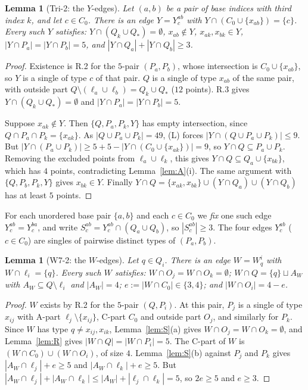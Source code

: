 \documentclass[11pt]{amsart}
\newtheorem{lemma}[theorem]{Lemma}
\theoremstyle{definition}
\begin{document}
\begin{lemma}[Tri-2: the $Y$-edges]\label{lem:tri2}
Let $(a,b)$ be a pair of base indices with third index $k$, and let $c\in C_0$. There is an edge $Y=Y^{ab}_c$ with $Y\cap(C_0\cup\{x_{ab}\})=\{c\}$. Every such $Y$ satisfies: $Y\cap(Q_k\cup Q_*)=\emptyset$, $x_{ab}\notin Y$, $x_{ak},x_{bk}\in Y$, $|Y\cap P_a|=|Y\cap P_b|=5$, and $|Y\cap Q_a|+|Y\cap Q_b|\ge 3$.
\end{lemma}
\begin{proof}
Existence is R.2 for the $5$-pair $(P_a,P_b)$, whose intersection is $C_0\cup\{x_{ab}\}$, so $Y$ is a single of type $c$ of that pair. $Q$ is a single of type $x_{ab}$ of the same pair, with outside part $Q\setminus(\ell_a\cup\ell_b)=Q_k\cup Q_*$ ($12$ points). R.3 gives $Y\cap(Q_k\cup Q_*)=\emptyset$ and $|Y\cap P_a|=|Y\cap P_b|=5$.

Suppose $x_{ak}\notin Y$. Then $\{Q,P_a,P_k,Y\}$ has empty intersection, since $Q\cap P_a\cap P_k=\{x_{ak}\}$. As $|Q\cup P_a\cup P_k|=49$, (L) forces $|Y\cap(Q\cup P_a\cup P_k)|\le 9$. But $|Y\cap(P_a\cup P_k)|\ge 5+5-|Y\cap(C_0\cup\{x_{ak}\})|=9$, so $Y\cap Q\subseteq P_a\cup P_k$. Removing the excluded points from $\ell_a\cup\ell_k$, this gives $Y\cap Q\subseteq Q_a\cup\{x_{bk}\}$, which has $4$ points, contradicting Lemma~\ref{lem:A}(i). The same argument with $\{Q,P_b,P_k,Y\}$ gives $x_{bk}\in Y$. Finally $Y\cap Q=\{x_{ak},x_{bk}\}\cup(Y\cap Q_a)\cup(Y\cap Q_b)$ has at least $5$ points.
\end{proof}

For each unordered base pair $\{a,b\}$ and each $c\in C_0$ we \emph{fix} one such edge $Y^{ab}_c=Y^{ba}_c$, and write $S^{ab}_c=Y^{ab}_c\cap(Q_a\cup Q_b)$, so $|S^{ab}_c|\ge 3$. The four edges $Y^{ab}_c$ ($c\in C_0$) are singles of pairwise distinct types of $(P_a,P_b)$.

\begin{lemma}[W7-2: the $W$-edges]\label{lem:W72}
Let $q\in Q_i$. There is an edge $W=W^i_q$ with $W\cap\ell_i=\{q\}$. Every such $W$ satisfies: $W\cap O_j=W\cap O_k=\emptyset$; $W\cap Q=\{q\}\sqcup A_W$ with $A_W\subseteq Q\setminus\ell_i$ and $|A_W|=4$; $e:=|W\cap C_0|\in\{3,4\}$; and $|W\cap O_i|=4-e$.
\end{lemma}
\begin{proof}
$W$ exists by R.2 for the $5$-pair $(Q,P_i)$. At this pair, $P_j$ is a single of type $x_{ij}$ with A-part $\ell_j\setminus\{x_{ij}\}$, C-part $C_0$ and outside part $O_j$, and similarly for $P_k$. Since $W$ has type $q\ne x_{ij},x_{ik}$, Lemma~\ref{lem:S}(a) gives $W\cap O_j=W\cap O_k=\emptyset$, and Lemma~\ref{lem:R} gives $|W\cap Q|=|W\cap P_i|=5$. The C-part of $W$ is $(W\cap C_0)\cup(W\cap O_i)$, of size $4$. Lemma~\ref{lem:S}(b) against $P_j$ and $P_k$ gives $|A_W\cap\ell_j|+e\ge 5$ and $|A_W\cap\ell_k|+e\ge5$. But $|A_W\cap\ell_j|+|A_W\cap\ell_k|\le |A_W|+|\ell_j\cap\ell_k|=5$, so $2e\ge 5$ and $e\ge 3$.
\end{proof}
\end{document}
